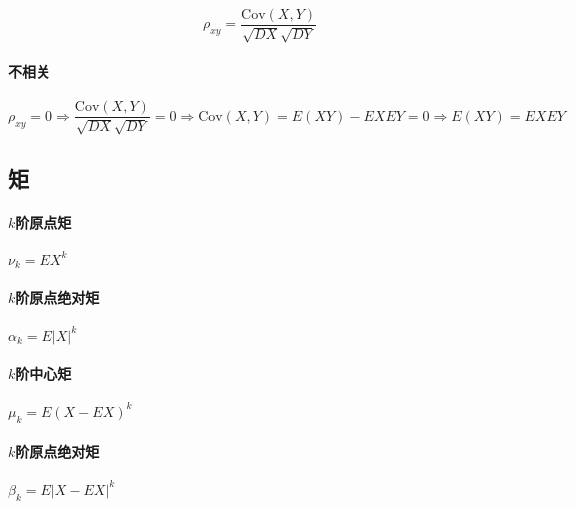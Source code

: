\begin{equation*}
  \rho_{xy} = \dfrac{\mathrm{Cov}(X,Y)}{\sqrt{DX} \sqrt{DY}}
\end{equation*}

\paragraph{不相关}
\begin{equation*}
\rho_{xy} = 0 \Rightarrow \dfrac{\mathrm{Cov}(X,Y)}{\sqrt{DX} \sqrt{DY}} = 0 \Rightarrow \mathrm{Cov}(X,Y)= E \left( XY \right) -EXEY = 0 \Rightarrow E \left( XY \right) = EXEY
\end{equation*}
\subsection{矩}

\paragraph{$k$阶原点矩}
$\nu_{k}=EX^{k}$

\paragraph{$k$阶原点绝对矩}
$\alpha_{k}=E|X|^{k}$

\paragraph{$k$阶中心矩}
$\mu_{k}=E(X-EX)^{k}$

\paragraph{$k$阶原点绝对矩}
$\beta_{k}=E|X-EX|^{k}$

